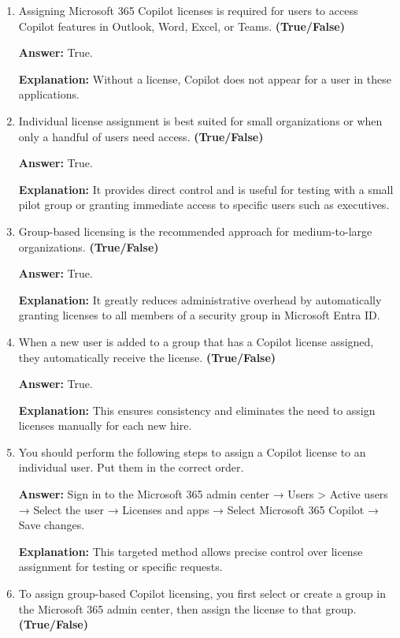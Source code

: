 \documentclass[10pt]{article}
\begin{document}
\begin{enumerate}[leftmargin=*]

\item Assigning Microsoft 365 Copilot licenses is required for users to access Copilot features in Outlook, Word, Excel, or Teams. \textbf{(True/False)}

\textbf{Answer:} True.

\textbf{Explanation:} Without a license, Copilot does not appear for a user in these applications.

\item Individual license assignment is best suited for small organizations or when only a handful of users need access. \textbf{(True/False)}

\textbf{Answer:} True.

\textbf{Explanation:} It provides direct control and is useful for testing with a small pilot group or granting immediate access to specific users such as executives.

\item Group-based licensing is the recommended approach for medium-to-large organizations. \textbf{(True/False)}

\textbf{Answer:} True.

\textbf{Explanation:} It greatly reduces administrative overhead by automatically granting licenses to all members of a security group in Microsoft Entra ID.

\item When a new user is added to a group that has a Copilot license assigned, they automatically receive the license. \textbf{(True/False)}

\textbf{Answer:} True.

\textbf{Explanation:} This ensures consistency and eliminates the need to assign licenses manually for each new hire.

\item You should perform the following steps to assign a Copilot license to an individual user. Put them in the correct order.

\textbf{Answer:} Sign in to the Microsoft 365 admin center → Users > Active users → Select the user → Licenses and apps → Select Microsoft 365 Copilot → Save changes.

\textbf{Explanation:} This targeted method allows precise control over license assignment for testing or specific requests.

\item To assign group-based Copilot licensing, you first select or create a group in the Microsoft 365 admin center, then assign the license to that group. \textbf{(True/False)}


\end{enumerate}
\end{document}
